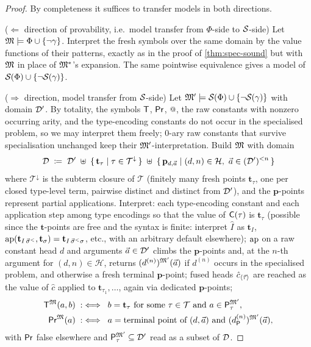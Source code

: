 \begin{proof}
By completeness it suffices to transfer models in both directions.

($\Leftarrow$ direction of provability, i.e.\ model transfer from
$\Phi$-side to $\mathcal{S}_{}$-side)  Let $\mathfrak{M} \models \Phi \cup
\{\neg\gamma\}$.  Interpret the fresh symbols over the same domain
by the value functions of their patterns, exactly as in the proof of
\cref{thm:spec-sound} but with $\mathfrak{M}$ in place of $\mathfrak{M}^{*}$'s
expansion.  The same pointwise equivalence gives a model of
$\mathcal{S}_{}(\Phi) \cup \{\neg\mathcal{S}_{}(\gamma)\}$.

($\Rightarrow$ direction, model transfer from $\mathcal{S}_{}$-side)  Let
$\mathfrak{M}' \models \mathcal{S}_{}(\Phi) \cup \{\neg\mathcal{S}_{}(\gamma)\}$ with
domain $\mathcal{D}'$.  By totality, the symbols $\mathsf{T}$, $\mathsf{Pr}$, $\app$,
the raw constants with nonzero occurring arity, and the type-encoding
constants do not occur in the specialised problem, so we may
interpret them freely; $0$-ary raw constants that survive
specialisation unchanged keep their $\mathfrak{M}'$-interpretation.  Build
$\mathfrak{M}$ with domain
\[
  \mathcal{D} \;\coloneqq\; \mathcal{D}' \;\uplus\;
  \{\,\mathbf{t}_\tau \mid \tau \in \mathcal{T}^{\downarrow}\,\}
  \;\uplus\;
  \{\,\mathbf{p}_{d, \vec{a}} \mid (d,n) \in \mathcal{H},\
    \vec{a} \in (\mathcal{D}')^{<n}\,\}
\]
where $\mathcal{T}^{\downarrow}$ is the subterm closure of
$\mathcal{T}$ (finitely many fresh points $\mathbf{t}_\tau$, one per
closed type-level term, pairwise distinct and distinct from
$\mathcal{D}'$), and the $\mathbf{p}$-points represent partial
applications.  Interpret: each type-encoding constant and each
application step among type encodings so that the value of
$\mathsf{C}(\tau)$ is $\mathbf{t}_\tau$ (possible since the
$\mathbf{t}$-points are free and the syntax is finite: interpret
$\hat{I}$ as $\mathbf{t}_I$, $\mathrm{ap}(\mathbf{t}_{I\,\vec{\sigma}^{<}},
\mathbf{t}_\sigma) = \mathbf{t}_{I\,\vec{\sigma}^{<}\sigma}$, etc.,
with an arbitrary default elsewhere); $\mathrm{ap}$ on a raw constant head
$d$ and arguments $\vec{a} \in \mathcal{D}'$ climbs the
$\mathbf{p}$-points and, at the $n$-th argument for $(d, n) \in
\mathcal{H}$, returns $(d^{(n)})^{\mathfrak{M}'}(\vec{a})$ if $d^{(n)}$
occurs in the specialised problem, and otherwise a fresh terminal
$\mathbf{p}$-point; fused heads
$\hat{c}_{\langle\vec{\tau}\rangle}$ are reached as the value of
$\hat{c}$ applied to $\mathbf{t}_{\tau_1}, \ldots$, again via
dedicated $\mathbf{p}$-points;
\begin{align*}
  \mathsf{T}^{\mathfrak{M}}(a, b) \;&:\iff\;
    b = \mathbf{t}_\tau \text{ for some } \tau \in \mathcal{T}
    \text{ and } a \in \mathsf{P}_{\tau}^{\mathfrak{M}'},\\
  \mathsf{Pr}^{\mathfrak{M}}(a) \;&:\iff\;
    a = \text{terminal point of } (d, \vec{a}) \text{ and }
    (d^{(n)}_{\mathsf{P}})^{\mathfrak{M}'}(\vec{a}),
\end{align*}
with $\mathsf{Pr}$ false elsewhere and $\mathsf{P}_{\tau}^{\mathfrak{M}'} \subseteq
\mathcal{D}'$ read as a subset of $\mathcal{D}$.


\end{proof}
